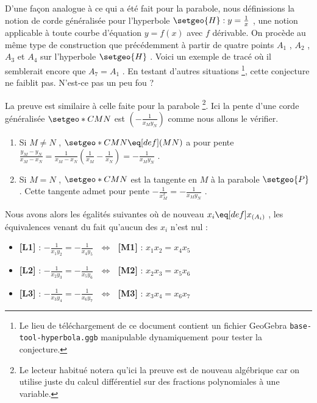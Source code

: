 D'une façon analogue à ce qui a été fait pour la parabole, nous définissions la notion de corde généralisée pour l'hyperbole $\setgeo{H} : y = \frac{1}{x}$ , une notion applicable à toute courbe d'équation $y = f(x)$ avec $f$ dérivable.
On procède au même type de construction que précédemment à partir de quatre points $A_1$ , $A_2$ , $A_3$ et $A_4$ sur l'hyperbole $\setgeo{H}$ . Voici un exemple de tracé où il semblerait encore que $A_7 = A_1$ . En testant d'autres situations
\footnote{
	Le lieu de téléchargement de ce document contient un fichier GeoGebra \texttt{base-tool-hyperbola.ggb} manipulable dynamiquement pour tester la conjecture.
},
cette conjecture ne faiblit pas. N'est-ce pas un peu fou ?
 

\vspace{1em}

\begin{center}
\end{center}

\vspace{1em}

 
La preuve est similaire à celle faite pour la parabole
\footnote{
	Le lecteur habitué notera qu'ici la preuve est de nouveau algébrique car on utilise juste du calcul différentiel sur des fractions polynomiales à une variable.
}.
Ici la pente d'une corde généralisée $\setgeo*{C}{MN}$ est $\left( - \frac{1}{x_M y_N} \right)$ comme nous allons le vérifier.
\begin{enumerate}
	\item Si $M \neq N$ , $\setgeo*{C}{MN} \eq[def] (MN)$ a pour pente $\frac{y_M - y_N}{x_M - x_N} = \frac{1}{x_M - x_N} \left( \frac{1}{x_M} - \frac{1}{x_N} \right) = - \frac{1}{x_M y_N}$ .

	\item Si $M = N$ , $\setgeo*{C}{MN}$ est la tangente en $M$ à la parabole $\setgeo{P}$ . Cette tangente admet pour pente $- \frac{1}{x_M^2} = - \frac{1}{x_M y_N}$ .
\end{enumerate}


\medskip

Nous avons alors les égalités suivantes où de nouveau $x_i \eq[def] x_{(A_i)}$ , les équivalences venant du fait qu'aucun des $x_i$ n'est nul :
\begin{itemize}[label=\small\textbullet]
	\item \textbf{[L1]} : 
	      $- \frac{1}{x_1 y_2} = - \frac{1}{x_4 y_5}$
	      $\,\, \Longleftrightarrow \,\,$
	      \textbf{[M1]} : 
	      $x_1 x_{2} = x_{4} x_{5}$

	\item \textbf{[L2]} : 
	      $- \frac{1}{x_2 y_3} = - \frac{1}{x_5 y_6}$
	      $\,\, \Longleftrightarrow \,\,$
	      \textbf{[M2]} : 
	      $x_2 x_{3} = x_{5} x_{6}$

	\item \textbf{[L3]} : 
	      $- \frac{1}{x_3 y_4} = - \frac{1}{x_6 y_7}$
	      $\,\, \Longleftrightarrow \,\,$
	      \textbf{[M3]} : 
	      $x_3 x_{4} = x_{6} x_{7}$
\end{itemize}


